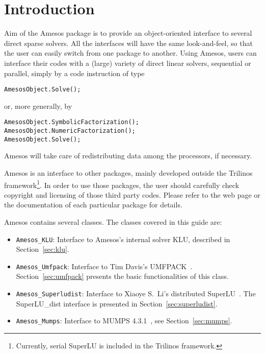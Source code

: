 \documentclass[11pt]{SANDreport}
\begin{document}
\clearpage

\section{Introduction}

Aim of the Amesos package is to provide an object-oriented interface to
several direct sparse solvers. All the interfaces will have the same
look-and-feel, so that the user can easily switch from one package to
another. Using Amesos, users can interface their codes with a (large)
variety of direct linear solvers, sequential or parallel, simply by a
code instruction of type
\begin{verbatim}
AmesosObject.Solve();
\end{verbatim}
or, more generally, by
\begin{verbatim}
AmesosObject.SymbolicFactorization();
AmesosObject.NumericFactorization();
AmesosObject.Solve();
\end{verbatim}
Amesos will take care of redistributing data among the
processors, if necessary.

Amesos is an interface to other packages, mainly developed outside the
Trilinos framework\footnote{Currently, serial SuperLU is included in the
  Trilinos framework.}. In order to use those packages, the user should
carefully check copyright and licensing of those third party codes.
Please refer to the web page or the documentation of each particular
package for details.

Amesos contains several classes. The classes covered in this guide are: 
\begin{itemize}
\item \verb!Amesos_KLU!: Interface to Amesos's internal solver
  KLU, described in Section~\ref{sec:klu}.
\item \verb!Amesos_Umfpack!: Interface to Tim Davis's
  UMFPACK~\cite{umfpack-home-page}. Section~\ref{sec:umfpack} presents the basic
  functionalities of this class.
\item \verb!Amesos_Superludist!: Interface to Xiaoye S.~Li's distributed
  SuperLU~\cite{superlu-home-page}. The SuperLU\_dist interface is
  presented in Section~\ref{sec:superludist}.
\item \verb!Amesos_Mumps!: Interface to MUMPS 4.3.1~\cite{mumps-home-page}, see
  Section~\ref{sec:mumps}.
\end{itemize}
\end{document}
